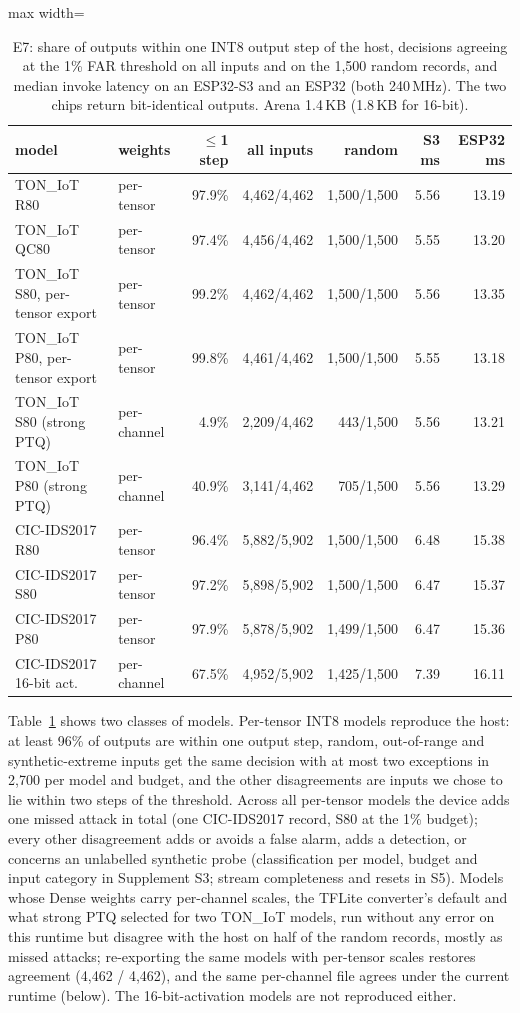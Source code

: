 \documentclass[sigplan,10pt,review,anonymous,nonacm]{acmart}
\newcommand{\cic}{CIC-IDS2017\xspace}
\newcommand{\ton}{TON\_IoT\xspace}
\begin{document}
\begin{table}[t]
\caption{E7: share of outputs within one INT8 output step of the host, decisions agreeing at the 1\%
FAR threshold on all inputs and on the 1,500 random records, and median invoke latency on an ESP32-S3
and an ESP32 (both 240\,MHz). The two chips return bit-identical outputs. Arena 1.4\,KB (1.8\,KB for 16-bit).}
\label{tab:e7}
\small\setlength{\tabcolsep}{2pt}
\begin{adjustbox}{max width=\columnwidth}
\begin{tabular}{llrrrrr}
\toprule
model & weights & $\le$1 step & all inputs & random & S3 ms & ESP32 ms \\
\midrule
\ton R80 & per-tensor & 97.9\% & 4,462/4,462 & 1,500/1,500 & 5.56 & 13.19 \\
\ton QC80 & per-tensor & 97.4\% & 4,456/4,462 & 1,500/1,500 & 5.55 & 13.20 \\
\ton S80, per-tensor export & per-tensor & 99.2\% & 4,462/4,462 & 1,500/1,500 & 5.56 & 13.35 \\
\ton P80, per-tensor export & per-tensor & 99.8\% & 4,461/4,462 & 1,500/1,500 & 5.55 & 13.18 \\
\ton S80 (strong PTQ) & per-channel & 4.9\% & 2,209/4,462 & 443/1,500 & 5.56 & 13.21 \\
\ton P80 (strong PTQ) & per-channel & 40.9\% & 3,141/4,462 & 705/1,500 & 5.56 & 13.29 \\
\cic R80 & per-tensor & 96.4\% & 5,882/5,902 & 1,500/1,500 & 6.48 & 15.38 \\
\cic S80 & per-tensor & 97.2\% & 5,898/5,902 & 1,500/1,500 & 6.47 & 15.37 \\
\cic P80 & per-tensor & 97.9\% & 5,878/5,902 & 1,499/1,500 & 6.47 & 15.36 \\
\cic 16-bit act. & per-channel & 67.5\% & 4,952/5,902 & 1,425/1,500 & 7.39 & 16.11 \\
\bottomrule
\end{tabular}
\end{adjustbox}
\end{table}

Table~\ref{tab:e7} shows two classes of models. Per-tensor INT8 models reproduce the host: at least
96\% of outputs are within one output step, random, out-of-range and synthetic-extreme inputs get the
same decision with at most two exceptions in 2,700 per model and budget, and the other disagreements are
inputs we chose to lie within two steps of the threshold. Across all per-tensor models the device adds
one missed attack in total (one \cic record, S80 at the 1\% budget); every other disagreement adds or
avoids a false alarm, adds a detection, or concerns an unlabelled synthetic probe (classification per
model, budget and input category in Supplement S3; stream completeness and resets in S5). Models whose
Dense weights carry per-channel scales, the TFLite converter's default and what strong PTQ selected for
two \ton models, run without any error on this runtime but disagree with the host on half of the random
records, mostly as missed attacks; re-exporting the same models with per-tensor scales restores agreement
(4,462 / 4,462), and the same per-channel file agrees under the current runtime (below). The
16-bit-activation models are not reproduced either.
\end{document}
